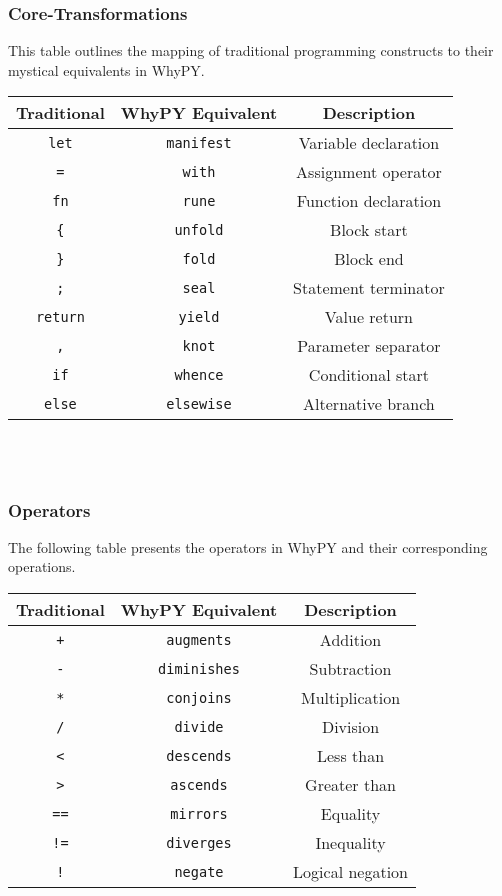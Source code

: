 \documentclass[conference]{IEEEtran}
\begin{document}
\subsubsection{Core-Transformations}
This table outlines the mapping of traditional programming constructs to their mystical equivalents in WhyPY. \\ 
\par \vspace{1mm} 
\begin{tabular}{|c|c|c|}
\hline
\textbf{Traditional} & \textbf{WhyPY Equivalent} & \textbf{Description} \\
\hline
\texttt{let} & \texttt{manifest} & Variable declaration \\
\texttt{=} & \texttt{with} & Assignment operator \\
\texttt{fn} & \texttt{rune} & Function declaration \\
\texttt{\{} & \texttt{unfold} & Block start \\
\texttt{\}} & \texttt{fold} & Block end \\
\texttt{;} & \texttt{seal} & Statement terminator \\
\texttt{return} & \texttt{yield} & Value return \\
\texttt{,} & \texttt{knot} & Parameter separator \\
\texttt{if} & \texttt{whence} & Conditional start \\
\texttt{else} & \texttt{elsewise} & Alternative branch \\
\hline
\end{tabular}
\\
\\

\subsubsection{Operators}
The following table presents the operators in WhyPY and their corresponding operations. \\
\par \vspace{1mm} 
\begin{tabular}{|c|c|c|}
\hline
\textbf{Traditional} & \textbf{WhyPY Equivalent} & \textbf{Description} \\
\hline
\texttt{+} & \texttt{augments} & Addition \\
\texttt{-} & \texttt{diminishes} & Subtraction \\
\texttt{*} & \texttt{conjoins} & Multiplication \\
\texttt{/} & \texttt{divide} & Division \\
\texttt{<} & \texttt{descends} & Less than \\
\texttt{>} & \texttt{ascends} & Greater than \\
\texttt{==} & \texttt{mirrors} & Equality \\
\texttt{!=} & \texttt{diverges} & Inequality \\
\texttt{!} & \texttt{negate} & Logical negation \\
\hline
\end{tabular}
\\
\\
\end{document}
